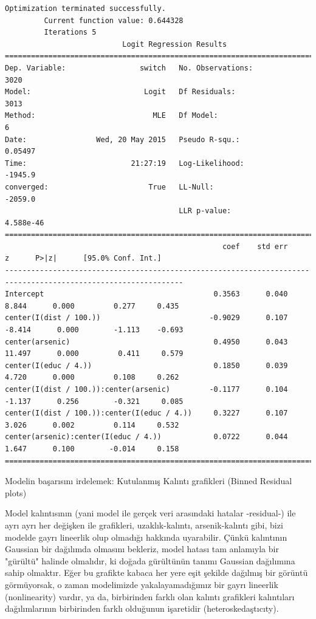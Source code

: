 \documentclass[12pt,fleqn]{article}\usepackage{../../common}
\begin{document}
\begin{verbatim}
Optimization terminated successfully.
         Current function value: 0.644328
         Iterations 5
                           Logit Regression Results                           
==============================================================================
Dep. Variable:                 switch   No. Observations:                 3020
Model:                          Logit   Df Residuals:                     3013
Method:                           MLE   Df Model:                            6
Date:                Wed, 20 May 2015   Pseudo R-squ.:                 0.05497
Time:                        21:27:19   Log-Likelihood:                -1945.9
converged:                       True   LL-Null:                       -2059.0
                                        LLR p-value:                 4.588e-46
===============================================================================================================
                                                  coef    std err          z      P>|z|      [95.0% Conf. Int.]
---------------------------------------------------------------------------------------------------------------
Intercept                                       0.3563      0.040      8.844      0.000         0.277     0.435
center(I(dist / 100.))                         -0.9029      0.107     -8.414      0.000        -1.113    -0.693
center(arsenic)                                 0.4950      0.043     11.497      0.000         0.411     0.579
center(I(educ / 4.))                            0.1850      0.039      4.720      0.000         0.108     0.262
center(I(dist / 100.)):center(arsenic)         -0.1177      0.104     -1.137      0.256        -0.321     0.085
center(I(dist / 100.)):center(I(educ / 4.))     0.3227      0.107      3.026      0.002         0.114     0.532
center(arsenic):center(I(educ / 4.))            0.0722      0.044      1.647      0.100        -0.014     0.158
===============================================================================================================
\end{verbatim}

Modelin başarısını irdelemek: Kutulanmış Kalıntı grafikleri (Binned Residual plots)

Model kalıntısının (yani model ile gerçek veri arasındaki hatalar -residual-)
ile ayrı ayrı her değişken ile grafikleri, uzaklık-kalıntı, arsenik-kalıntı
gibi, bizi modelde gayrı lineerlik olup olmadığı hakkında uyarabilir. Çünkü
kalıntının Gaussian bir dağılımda olmasını bekleriz, model hatası tam anlamıyla
bir "gürültü" halinde olmalıdır, ki doğada gürültünün tanımı Gaussian dağılımına
sahip olmaktır. Eğer bu grafikte kabaca her yere eşit şekilde dağılmış bir
görüntü görmüyorsak, o zaman modelimizde yakalayamadığımız bir gayrı lineerlik
(nonlinearity) vardır, ya da, birbirinden farklı olan kalıntı grafikleri
kalıntıları dağılımlarının birbirinden farklı olduğunun işaretidir
(heteroskedaştıcıty).
\end{document}
